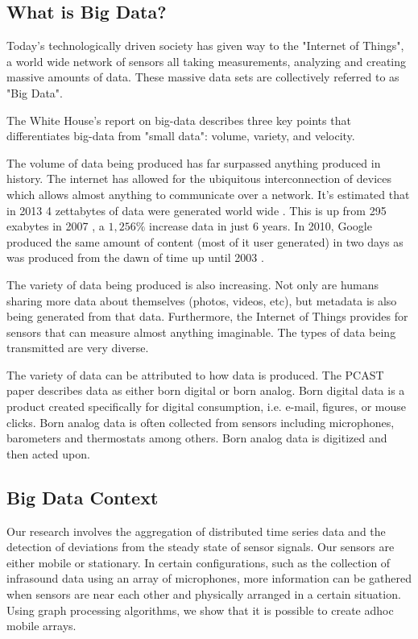 \subsection{What is Big Data?}
Today's technologically driven society has given way to the "Internet of Things", a world wide network of sensors all taking measurements, analyzing and creating massive amounts of data. These massive data sets are collectively referred to as "Big Data".

The White House's report on big-data describes three key points that differentiates big-data from "small data": volume, variety, and velocity.

The volume of data being produced has far surpassed anything produced in history. The internet has allowed for the ubiquitous interconnection of devices which allows almost anything to communicate over a network.  It's estimated that in 2013 4 zettabytes of data were generated world wide \cite{kpcb}. This is up from 295 exabytes in 2007 \cite{hilbert_worlds_2011}, a $1,256\%$ increase data in just 6 years. In 2010, Google produced the same amount of content (most of it user generated) in two days as was produced from the dawn of time up until 2003 \cite{schmidt2010}.

The variety of data being produced is also increasing. Not only are humans sharing more data about themselves (photos, videos, etc), but metadata is also being generated from that data. Furthermore, the Internet of Things provides for sensors that can measure almost anything imaginable. The types of data being transmitted are very diverse.

The variety of data can be attributed to how data is produced. The PCAST paper describes data as either born digital or born analog. Born digital data is a product created specifically for digital consumption, i.e. e-mail, figures, or mouse clicks. Born analog data is often collected from sensors including microphones, barometers and thermostats among others. Born analog data is digitized and then acted upon.

\subsection{Big Data Context}
Our research involves the aggregation of distributed time series data and the detection of deviations from the steady state of sensor signals. Our sensors are either mobile or stationary. In certain configurations, such as the collection of infrasound data using an array of microphones, more information can be gathered when sensors are near each other and physically arranged in a certain situation. Using graph processing algorithms, we show that it is possible to create adhoc mobile arrays.

